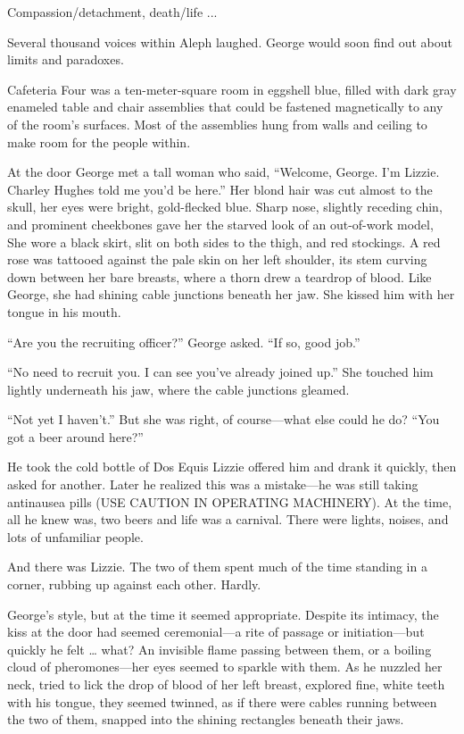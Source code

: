 Compassion/detachment, death/life ...

Several thousand voices within Aleph laughed. George would soon find out about limits and paradoxes.

Cafeteria Four was a ten-meter-square room in eggshell blue, filled with dark gray enameled table and chair assemblies that could be fastened magnetically to any of the room’s surfaces. Most of the assemblies hung from walls and ceiling to make room for the people within.

At the door George met a tall woman who said, “Welcome, George. I’m Lizzie. Charley Hughes told me you’d be here.” Her blond hair was cut almost to the skull, her eyes were bright, gold-flecked blue. Sharp nose, slightly receding chin, and prominent cheekbones gave her the starved look of an out-of-work model, She wore a black skirt, slit on both sides to the thigh, and red stockings. A red rose was tattooed against the pale skin on her left shoulder, its stem curving down between her bare breasts, where a thorn drew a teardrop of blood. Like George, she had shining cable junctions beneath her jaw. She kissed him with her tongue in his mouth.

“Are you the recruiting officer?” George asked. “If so, good job.”

“No need to recruit you. I can see you’ve already joined up.” She touched him lightly underneath his jaw, where the cable junctions gleamed.

“Not yet I haven’t.” But she was right, of course—what else could he do? “You got a beer around here?”

He took the cold bottle of Dos Equis Lizzie offered him and drank it quickly, then asked for another. Later he realized this was a mistake—he was still taking antinausea pills (USE CAUTION IN OPERATING MACHINERY). At the time, all he knew was, two beers and life was a carnival. There were lights, noises, and lots of unfamiliar people.

And there was Lizzie. The two of them spent much of the time standing in a corner, rubbing up against each other. Hardly.

George’s style, but at the time it seemed appropriate. Despite its intimacy, the kiss at the door had seemed ceremonial—a rite of passage or initiation—but quickly he felt … what? An invisible flame passing between them, or a boiling cloud of pheromones—her eyes seemed to sparkle with them. As he nuzzled her neck, tried to lick the drop of blood of her left breast, explored fine, white teeth with his tongue, they seemed twinned, as if there were cables running between the two of them, snapped into the shining rectangles beneath their jaws.

